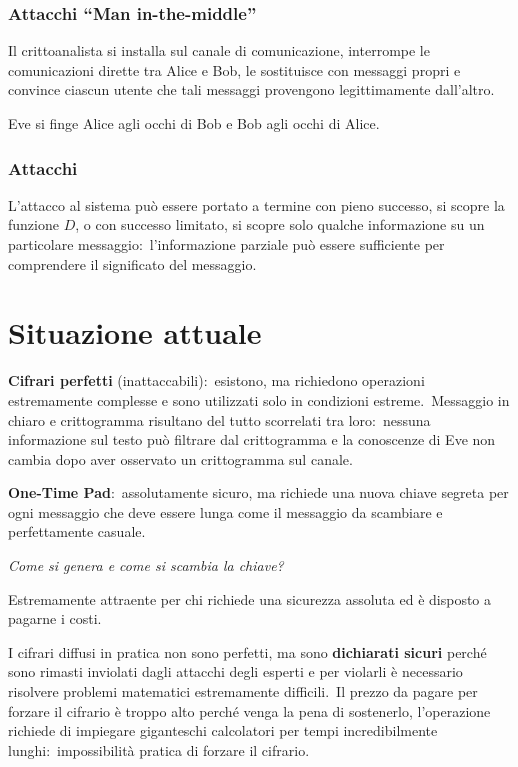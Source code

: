 \subsubsection{Attacchi ``Man in-the-middle''}

Il crittoanalista si installa sul canale di comunicazione, interrompe le comunicazioni dirette tra Alice e Bob, le sostituisce con messaggi propri e convince ciascun utente che tali messaggi provengono legittimamente dall'altro.\
\begin{center}
    Eve si finge Alice agli occhi di Bob e Bob agli occhi di Alice.
\end{center}

\subsubsection{Attacchi}

L'attacco al sistema può essere portato a termine con pieno successo, si scopre la funzione $D$, o con successo limitato, si scopre solo qualche informazione su un particolare messaggio:\ l'informazione parziale può essere sufficiente per comprendere il significato del messaggio.\

\section{Situazione attuale}

\textbf{Cifrari perfetti} (inattaccabili):\ esistono, ma richiedono operazioni estremamente complesse e sono utilizzati solo in condizioni estreme.\
Messaggio in chiaro e crittogramma risultano del tutto scorrelati tra loro:\ nessuna informazione sul testo può filtrare dal crittogramma e la conoscenze di Eve non cambia dopo aver osservato un crittogramma sul canale.\

\textbf{One-Time Pad}:\ assolutamente sicuro, ma richiede una nuova chiave segreta per ogni messaggio che deve essere lunga come il messaggio da scambiare e perfettamente casuale.\
\begin{center}
    \textit{Come si genera e come si scambia la chiave?}
\end{center}
Estremamente attraente per chi richiede una sicurezza assoluta ed è disposto a pagarne i costi.\

I cifrari diffusi in pratica non sono perfetti, ma sono \textbf{dichiarati sicuri} perché sono rimasti inviolati dagli attacchi degli esperti e per violarli è necessario risolvere problemi matematici estremamente difficili.\
Il prezzo da pagare per forzare il cifrario è troppo alto perché venga la pena di sostenerlo, l'operazione richiede di impiegare giganteschi calcolatori per tempi incredibilmente lunghi:\ impossibilità pratica di forzare il cifrario.\

